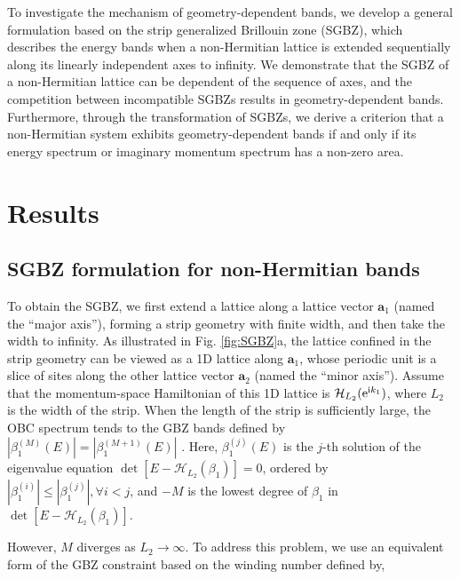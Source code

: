 \documentclass[pdflatex,sn-nature,iicol]{sn-jnl}
\theoremstyle{thmstyleone}%
\theoremstyle{thmstyletwo}%
\theoremstyle{thmstylethree}%
\begin{document}
To investigate the mechanism of geometry-dependent bands, we develop
a general formulation based on the strip generalized Brillouin zone
(SGBZ), which describes the energy bands when a non-Hermitian lattice
is extended sequentially along its linearly independent axes to infinity.
We demonstrate that the SGBZ of a non-Hermitian lattice can be dependent
of the sequence of axes, and the competition between incompatible
SGBZs results in geometry-dependent bands. Furthermore, through the
transformation of SGBZs, we derive a criterion that a non-Hermitian
system exhibits geometry-dependent bands if and only if its energy
spectrum or imaginary momentum spectrum has a non-zero area.

\section{Results}

\subsection{SGBZ formulation for non-Hermitian bands}

To obtain the SGBZ, we first extend a lattice along a lattice vector
$\mathbf{a}_{1}$ (named the ``major axis''), forming a strip geometry
with finite width, and then take the width to infinity. As illustrated
in Fig. \ref{fig:SGBZ}a, the lattice confined in the strip geometry
can be viewed as a 1D lattice along $\mathbf{a}_{1}$, whose periodic
unit is a slice of sites along the other lattice vector $\mathbf{a}_{2}$
(named the ``minor axis''). Assume that the momentum-space Hamiltonian
of this 1D lattice is $\mathcal{H}_{L_{2}}(\mathrm{e}^{\mathrm{i} k_{1}})$, where
$L_{2}$ is the width of the strip. When the length of the strip is
sufficiently large, the OBC spectrum tends to the GBZ bands defined
by $|\beta_{1}^{(M)}(E)|=|\beta_{1}^{(M+1)}(E)|$ \cite{yaoEdgeStatesTopological2018,yokomizoNonBlochBandTheory2019}.
Here, $\beta_{1}^{(j)}(E)$ is the $j$-th solution of the eigenvalue
equation $\det[E-\mathcal{H}_{L_{2}}(\beta_{1})]=0$, ordered by $|\beta_{1}^{(i)}|\leq|\beta_{1}^{(j)}|,\forall i<j$,
and $-M$ is the lowest degree of $\beta_{1}$ in $\det[E-\mathcal{H}_{L_{2}}(\beta_{1})]$.

However, $M$ diverges as $L_{2}\rightarrow\infty$. 
To address this problem, we use an equivalent form of the GBZ constraint based on the winding number defined by,
\end{document}

